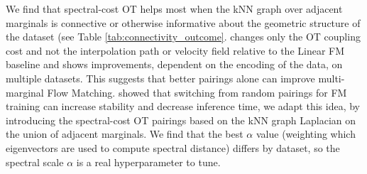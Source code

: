 

We find that spectral-cost OT helps most when the kNN graph over adjacent marginals is connective or otherwise informative about the geometric structure of the dataset (see Table \ref{tab:connectivity_outcome}. \ourmodel changes only the OT coupling cost and not the interpolation path or velocity field relative to the Linear FM baseline and shows improvements, dependent on the encoding of the data, on multiple datasets. This suggests that better pairings alone can improve multi-marginal Flow Matching. \cite{tongImprovingGeneralizingFlowbased2024} showed that switching from random pairings for FM training can increase stability and decrease inference time, we adapt this idea, by introducing the spectral-cost OT pairings based on the kNN graph Laplacian on the union of adjacent marginals. We find that the best $\alpha$ value (weighting which eigenvectors are used to compute spectral distance) differs by dataset, so the spectral scale $\alpha$ is a real hyperparameter to tune.